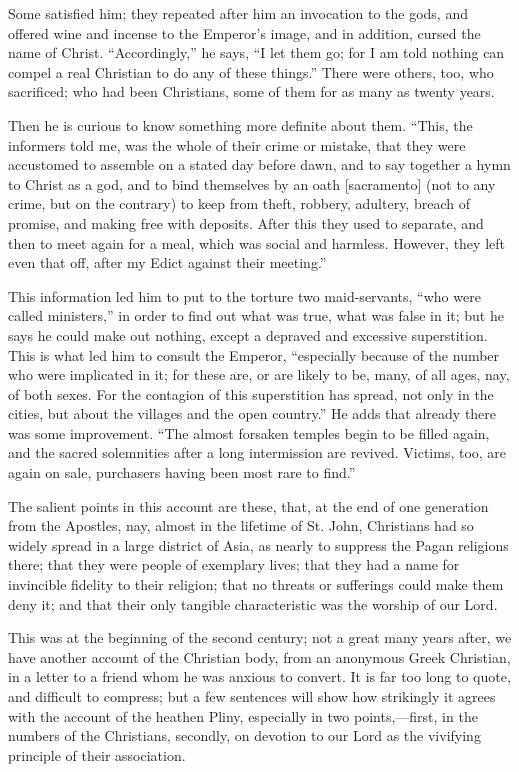 Some satisfied him; they repeated after him an invocation to the
gods, and offered wine and incense to the Emperor's image, and in
addition, cursed the name of Christ. ``Accordingly,'' he says,
``I let them go; for I am told nothing can compel a real Christian
to do any of these things.'' There were others, too, who
sacrificed; who had been Christians, some of them for as many as
twenty years.

Then he is curious to know something more definite about them.
``This, the informers told me, was the whole of their crime or
mistake, that they were accustomed to assemble on a stated day before
dawn, and to say together a hymn to Christ as a god, and to bind
themselves by an oath [sacramento] (not to any crime, but on the
contrary) to keep from theft, robbery, adultery, breach of promise,
and making free with deposits. After this they used to separate, and
then to meet again for a meal, which was social and harmless. However,
they left even that off, after my Edict against their meeting.''

This information led him to put to the torture two maid-servants,
``who were called ministers,'' in order to find out what was
true, what was false in it; but he says he could make out nothing,
except a depraved and excessive superstition. This is what led
him to consult the Emperor, ``especially because of the number who
were implicated in it; for these are, or are likely to be, many, of
all ages, nay, of both sexes. For the contagion of this superstition
has spread, not only in the cities, but about the villages and the
open country.'' He adds that already there was some improvement.
``The almost forsaken temples begin to be filled again, and the
sacred solemnities after a long intermission are revived. Victims,
too, are again on sale, purchasers having been most rare to
find.''

The salient points in this account are these, that, at the end of
one generation from the Apostles, nay, almost in the lifetime of St.
John, Christians had so widely spread in a large district of Asia, as
nearly to suppress the Pagan religions there; that they were people of
exemplary lives; that they had a name for invincible fidelity to their
religion; that no threats or sufferings could make them deny it; and
that their only tangible characteristic was the worship of our Lord.

This was at the beginning of the second century; not a great many
years after, we have another account of the Christian body, from an
anonymous Greek Christian, in a letter to a friend whom he was anxious
to convert. It is far too long to quote, and difficult to compress;
but a few sentences will show how strikingly it agrees with the
account of the heathen Pliny, especially in two points,—first, in
the numbers of the Christians, secondly, on devotion to our Lord as
the vivifying principle of their association.


